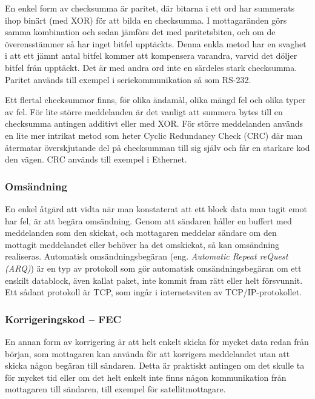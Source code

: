 En enkel form av checksumma är paritet, där bitarna i ett ord har summerats ihop
binärt (med XOR) för att bilda en checksumma. I mottagaränden görs samma
kombination och sedan jämförs det med paritetsbiten, och om de överensstämmer så
har inget bitfel upptäckts. Denna enkla metod har en svaghet i att ett jämnt
antal bitfel kommer att kompensera varandra, varvid det döljer bitfel från
upptäckt.
Det är med andra ord inte en särdeles stark checksumma.
Paritet används till exempel i seriekommunikation så som RS-232.

Ett flertal checksummor finns, för olika ändamål, olika mängd fel och olika
typer av fel. För lite större meddelanden är det vanligt att summera bytes
till en checksumma antingen additivt eller med XOR. För större meddelanden
används en lite mer intrikat metod som heter Cyclic Redundancy Check (CRC)
där man återmatar överskjutande del på checksumman till sig själv och får en
starkare kod den vägen. CRC används till exempel i Ethernet.

\subsubsection{Omsändning}

En enkel åtgärd att vidta när man konstaterat att ett block data man
tagit emot har fel, är att begära omsändning.
Genom att sändaren håller en buffert med meddelanden som den skickat, och
mottagaren meddelar sändare om den mottagit meddelandet eller behöver ha det
omskickat, så kan omsändning realiseras.
Automatisk omsändningsbegäran (eng. \emph{Automatic Repeat reQuest (ARQ)}) är en
typ av protokoll som gör automatisk omsändningsbegäran om ett enskilt datablock,
även kallat paket, inte kommit fram rätt eller helt försvunnit.
Ett sådant protokoll är TCP, som ingår i internetsviten av TCP/IP-protokollet.

\subsubsection{Korrigeringskod -- FEC}

En annan form av korrigering är att helt enkelt skicka för mycket data redan
från början, som mottagaren kan använda för att korrigera meddelandet utan att
skicka någon begäran till sändaren.
Detta är praktiskt antingen om det skulle ta för mycket tid eller om det helt
enkelt inte finns någon kommunikation från mottagaren till sändaren, till
exempel för satellitmottagare.

